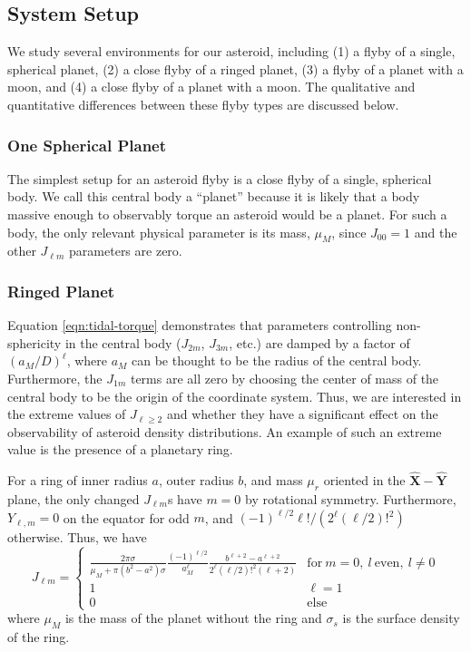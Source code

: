 \documentclass[11pt]{article}
\newcommand{\unit}[1]{\hat{\mathbf{#1}}}
\begin{document}
\subsection{System Setup}
We study several environments for our asteroid, including (1) a flyby of a single, spherical planet, (2) a close flyby of a ringed planet, (3) a flyby of a planet with a moon, and (4) a close flyby of a planet with a moon. The qualitative and quantitative differences between these flyby types are discussed below.

\subsubsection{One Spherical Planet}
The simplest setup for an asteroid flyby is a close flyby of a single, spherical body. We call this central body a ``planet'' because it is likely that a body massive enough to observably torque an asteroid would be a planet. For such a body, the only relevant physical parameter is its mass, $\mu_M$, since $J_{00} = 1$ and the other $J_{\ell m}$ parameters are zero.

\subsubsection{Ringed Planet}
Equation \ref{eqn:tidal-torque} demonstrates that parameters controlling non-sphericity in the central body ($J_{2m}$, $J_{3m}$, etc.) are damped by a factor of $(a_M/D)^\ell$, where $a_M$ can be thought to be the radius of the central body. Furthermore, the $J_{1m}$ terms are all zero by choosing the center of mass of the central body to be the origin of the coordinate system. Thus, we are interested in the extreme values of $J_{\ell \geq 2}$ and whether they have a significant effect on the observability of asteroid density distributions. An example of such an extreme value is the presence of a planetary ring.

For a ring of inner radius $a$, outer radius $b$, and mass $\mu_r$ oriented in the $\unit X-\unit Y$ plane, the only changed $J_{\ell m}$s have $m = 0$ by rotational symmetry. Furthermore, $Y_{\ell, m} = 0$ on the equator for odd $m$, and $(-1)^{\ell/2} \ell! / (2^\ell (\ell/2)!^2)$ otherwise. Thus, we have
\begin{equation}
J_{\ell m} = \begin{cases}
\frac{2 \pi \sigma}{\mu_M + \pi(b^2-a^2)\sigma}\frac{(-1)^{\ell/2}}{a_M^\ell}\frac{b^{\ell+2} - a^{\ell+2}}{2^\ell (\ell/2)!^2 (\ell + 2)}
 & \text{for}\ m = 0,\ l\ \text{even},\ l \neq 0\\
1 & \ell = 1\\
0 & \text{else}
\end{cases}
\label{eqn:ring-jlm}
\end{equation}
where $\mu_M$ is the mass of the planet without the ring and $\sigma_s$ is the surface density of the ring.
\end{document}
